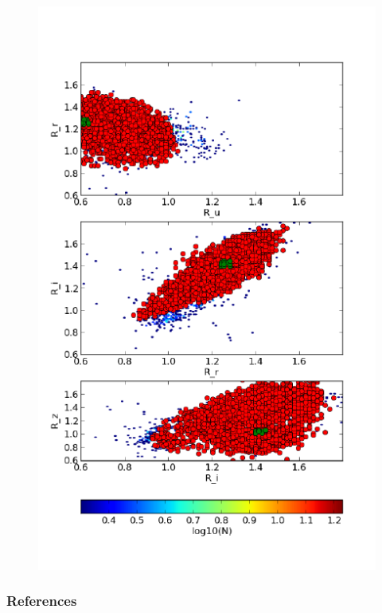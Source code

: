 \documentclass[10pt,xcolor={table,dvipsnames},t]{beamer}
\begin{document}
\begin{frame}
\begin{figure}
\vspace{-2em}
\begin{center}
    \includegraphics[height=1.2\textheight]{images/gmode.png}
\end{center}
\end{figure}
\end{frame}

\begin{frame}
\frametitle{References}




\end{frame}
\end{document}

